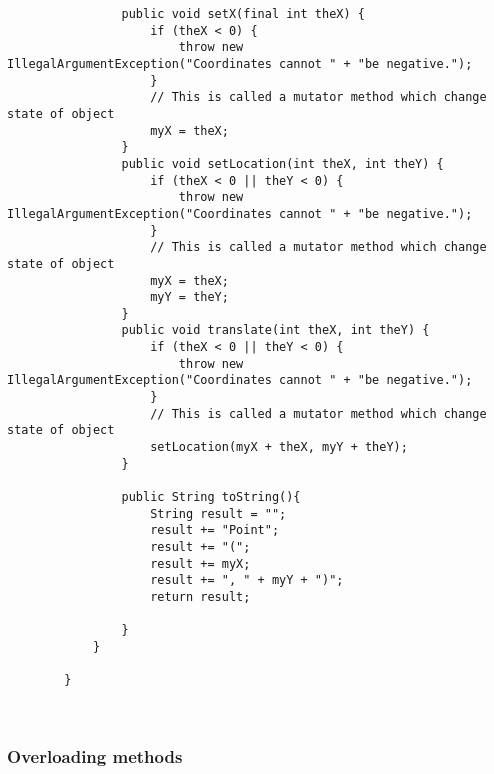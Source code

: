 \documentclass{article}
\begin{document}
\begin{lstlisting}
                public void setX(final int theX) {
                    if (theX < 0) {
                        throw new IllegalArgumentException("Coordinates cannot " + "be negative.");
                    }
                    // This is called a mutator method which change state of object 
                    myX = theX;
                }
                public void setLocation(int theX, int theY) {
                    if (theX < 0 || theY < 0) {
                        throw new IllegalArgumentException("Coordinates cannot " + "be negative.");
                    }
                    // This is called a mutator method which change state of object
                    myX = theX;
                    myY = theY;
                }
                public void translate(int theX, int theY) {
                    if (theX < 0 || theY < 0) {
                        throw new IllegalArgumentException("Coordinates cannot " + "be negative.");
                    }
                    // This is called a mutator method which change state of object
                    setLocation(myX + theX, myY + theY);
                }
        
                public String toString(){
                    String result = "";
                    result += "Point";
                    result += "(";
                    result += myX;
                    result += ", " + myY + ")";
                    return result; 
            
                }
            }    
            
        }
                
        
    \end{lstlisting}

    \subsubsection{Overloading methods}
        
\end{document}
